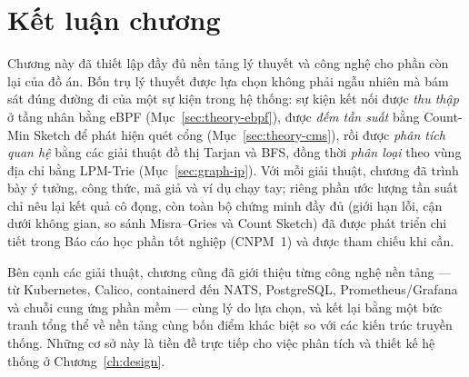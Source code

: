 \section{Kết luận chương}

Chương này đã thiết lập đầy đủ nền tảng lý thuyết và công nghệ cho phần còn lại của đồ
án. Bốn trụ lý thuyết được lựa chọn không phải ngẫu nhiên mà bám sát đúng đường đi của
một sự kiện trong hệ thống: sự kiện kết nối được \emph{thu thập} ở tầng nhân bằng eBPF
(Mục~\ref{sec:theory-ebpf}), được \emph{đếm tần suất} bằng Count-Min Sketch để phát hiện
quét cổng (Mục~\ref{sec:theory-cms}), rồi được \emph{phân tích quan hệ} bằng các giải
thuật đồ thị Tarjan và BFS, đồng thời \emph{phân loại} theo vùng địa chỉ bằng LPM-Trie
(Mục~\ref{sec:graph-ip}). Với mỗi giải thuật, chương đã trình bày ý tưởng, công thức,
mã giả và ví dụ chạy tay; riêng phần ước lượng tần suất chỉ nêu lại kết quả cô đọng, còn
toàn bộ chứng minh đầy đủ (giới hạn lỗi, cận dưới không gian, so sánh Misra--Gries và
Count Sketch) đã được phát triển chi tiết trong Báo cáo học phần tốt nghiệp (CNPM~1) và
được tham chiếu khi cần.

Bên cạnh các giải thuật, chương cũng đã giới thiệu từng công nghệ nền tảng --- từ
Kubernetes, Calico, containerd đến NATS, PostgreSQL, Prometheus/Grafana và chuỗi cung
ứng phần mềm --- cùng lý do lựa chọn, và kết lại bằng một bức tranh tổng thể về nền tảng
cùng bốn điểm khác biệt so với các kiến trúc truyền thống. Những cơ sở này là tiền đề
trực tiếp cho việc phân tích và thiết kế hệ thống ở Chương~\ref{ch:design}.
